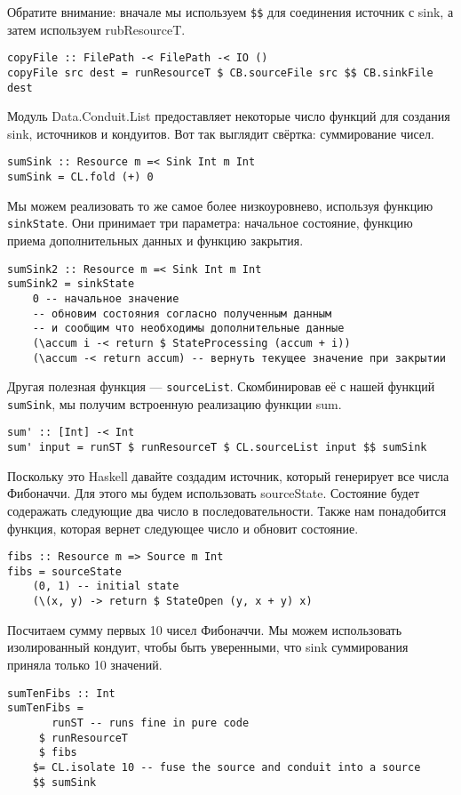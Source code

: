 Обратите внимание: вначале мы используем \verb=$$= для соединения источник с sink, а
затем используем rubResourceT.
\begin{verbatim}
copyFile :: FilePath -< FilePath -< IO ()
copyFile src dest = runResourceT $ CB.sourceFile src $$ CB.sinkFile dest
\end{verbatim}
Модуль Data.Conduit.List предоставляет некоторые число функций для создания sink,
источников и кондуитов. Вот так выглядит свёртка: суммирование чисел.
\begin{verbatim}
sumSink :: Resource m =< Sink Int m Int
sumSink = CL.fold (+) 0
\end{verbatim}
Мы можем реализовать то же самое более низкоуровнево, используя функцию \verb=sinkState=.
Они принимает три параметра: начальное состояние, функцию приема дополнительных данных и
функцию закрытия.
\begin{verbatim}
sumSink2 :: Resource m =< Sink Int m Int
sumSink2 = sinkState
    0 -- начальное значение
    -- обновим состояния согласно полученным данным 
    -- и сообщим что необходимы дополнительные данные
    (\accum i -< return $ StateProcessing (accum + i))
    (\accum -< return accum) -- вернуть текущее значение при закрытии
\end{verbatim}
Другая полезная функция --- \verb=sourceList=. Скомбинировав её с нашей функций
\verb=sumSink=, мы получим встроенную реализацию функции sum.
\begin{verbatim}
sum' :: [Int] -< Int
sum' input = runST $ runResourceT $ CL.sourceList input $$ sumSink
\end{verbatim}
Поскольку это Haskell давайте создадим источник, который генерирует все числа Фибоначчи.
Для этого мы будем использовать sourceState. Состояние будет содеражать следующие два
число в последовательности. Также нам понадобится функция, которая вернет следующее число
и обновит состояние.
\begin{verbatim}fibs :: Resource m => Source m Int
fibs = sourceState
    (0, 1) -- initial state
    (\(x, y) -> return $ StateOpen (y, x + y) x)
\end{verbatim}
Посчитаем сумму первых 10 чисел Фибоначчи. Мы можем использовать изолированный кондуит,
чтобы быть уверенными, что sink суммирования приняла только 10 значений.
\begin{verbatim}sumTenFibs :: Int
sumTenFibs =
       runST -- runs fine in pure code
     $ runResourceT
     $ fibs
    $= CL.isolate 10 -- fuse the source and conduit into a source
    $$ sumSink
\end{verbatim}
